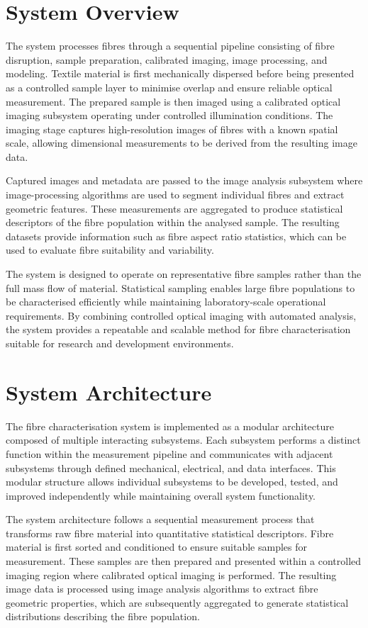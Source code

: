 \documentclass[a4paper, 12pt, english]{article}
\begin{document}
\section{System Overview}

The system processes fibres through a sequential pipeline consisting of fibre disruption, sample preparation, calibrated imaging, image processing, and modeling. Textile material is first mechanically dispersed before being presented as a controlled sample layer to minimise overlap and ensure reliable optical measurement. The prepared sample is then imaged using a calibrated optical imaging subsystem operating under controlled illumination conditions. The imaging stage captures high-resolution images of fibres with a known spatial scale, allowing dimensional measurements to be derived from the resulting image data.

Captured images and metadata are passed to the image analysis subsystem where image-processing algorithms are used to segment individual fibres and extract geometric features. These measurements are aggregated to produce statistical descriptors of the fibre population within the analysed sample. The resulting datasets provide information such as fibre aspect ratio statistics, which can be used to evaluate fibre suitability and variability.

The system is designed to operate on representative fibre samples rather than the full mass flow of material. Statistical sampling enables large fibre populations to be characterised efficiently while maintaining laboratory-scale operational requirements. By combining controlled optical imaging with automated analysis, the system provides a repeatable and scalable method for fibre characterisation suitable for research and development environments.

\section{System Architecture}

The fibre characterisation system is implemented as a modular architecture composed of multiple interacting subsystems. Each subsystem performs a distinct function within the measurement pipeline and communicates with adjacent subsystems through defined mechanical, electrical, and data interfaces. This modular structure allows individual subsystems to be developed, tested, and improved independently while maintaining overall system functionality.

The system architecture follows a sequential measurement process that transforms raw fibre material into quantitative statistical descriptors. Fibre material is first sorted and conditioned to ensure suitable samples for measurement. These samples are then prepared and presented within a controlled imaging region where calibrated optical imaging is performed. The resulting image data is processed using image analysis algorithms to extract fibre geometric properties, which are subsequently aggregated to generate statistical distributions describing the fibre population.
\end{document}
